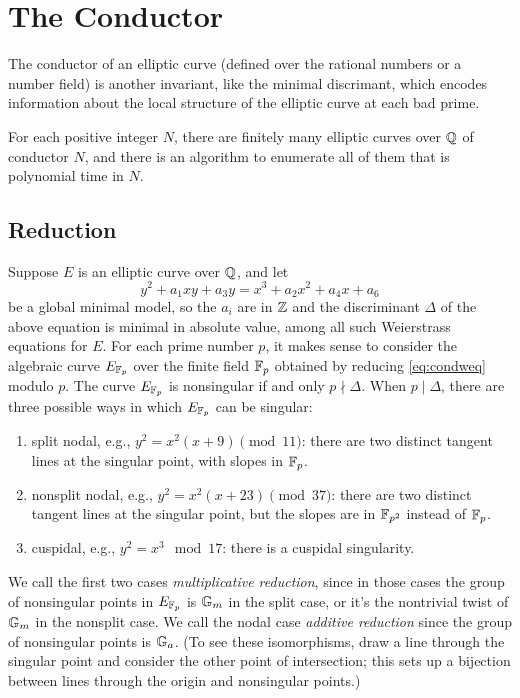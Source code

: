 \documentclass{book}
\begin{document}
\newpage
\section{The Conductor}
The conductor of an elliptic curve (defined over the rational numbers
or a number field) is another
invariant, like the minimal discrimant,
which encodes information about the local structure
of the elliptic curve at each bad prime.

\begin{theorem}
For each positive integer $N$,
there are finitely many elliptic curves over $\mathbb{Q}$
of conductor $N$, and there is an algorithm
to enumerate all of them that is polynomial
time in $N$.
\end{theorem}

\subsection{Reduction}
Suppose $E$ is an elliptic curve over $\mathbb{Q}$, and let
\begin{equation}\label{eq:condweq}
y^2 + a_1 xy + a_3 y = x^3 + a_2 x^2 + a_4 x + a_6
\end{equation}
be a global minimal model, so the $a_i$ are in $\mathbb{Z}$
and the discriminant $\Delta$ of the above equation is minimal
in absolute value, among all such Weierstrass equations for $E$.
For each prime number $p$, it makes sense to consider
the algebraic curve $E_{\mathbb{F}_p}$ over the finite field
$\mathbb{F}_p$ obtained by reducing \eqref{eq:condweq} modulo $p$.
The curve $E_{\mathbb{F}_p}$ is nonsingular if and only $p\nmid \Delta$.
When $p\mid \Delta$, there are three possible ways in which
$E_{\mathbb{F}_p}$ can be singular:
\begin{enumerate}
\item split nodal, e.g., $y^2=x^2(x+9)\pmod{11}$: there are two distinct
tangent lines at the singular point, with slopes in $\mathbb{F}_p$.
\item nonsplit nodal, e.g., $y^2=x^2(x+23) \pmod{37}$: there are two distinct tangent lines
at the singular point, but the slopes are in $\mathbb{F}_{p^2}$ instead
of $\mathbb{F}_p$.
\item cuspidal, e.g., $y^2=x^3\mod{17}$: there is a cuspidal singularity.
\end{enumerate}
We call the first two cases {\em multiplicative reduction}, since in those
cases the group of nonsingular points in $E_{\mathbb{F}_p}$ is $\mathbb{G}_m$ in
the split case, or it's the nontrivial twist of $\mathbb{G}_m$ in the nonsplit case.
We call the nodal case {\em additive reduction} since the group of nonsingular points is $\mathbb{G}_a$.  (To see these isomorphisms, draw a line through the singular point and consider the other point of intersection; this sets up a bijection between lines through the origin and nonsingular points.)
\end{document}
